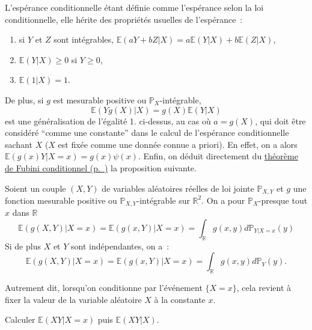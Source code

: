 L'espérance conditionnelle étant définie comme l'espérance selon la loi
conditionnelle, elle hérite des propriétés usuelles de l'espérance~:

\begin{enumerate}
\def\labelenumi{\arabic{enumi}.}
\tightlist
\item
  si \(Y\) et \(Z\) sont intégrables,
  \(\mathbb{E}(aY + bZ | X) = a \mathbb{E}(Y | X) + b \mathbb{E}(Z | X)\),
\item
  \(\mathbb{E}(Y | X) \geq 0\) si \(Y \geq 0\),
\item
  \(\mathbb{E}(1 | X) = 1\).
\end{enumerate}

De plus, si \(g\) est mesurable positive ou \(\mathbb{P}_X\)-intégrable,
\[ \mathbb{E}(Y g(X) | X) = g(X) \mathbb{E}(Y | X) \] est une
généralisation de l'égalité 1. ci-dessus, au cas où \(a = g(X)\), qui
doit être considéré ``comme une constante'' dans le calcul de
l'espérance conditionnelle sachant \(X\) (\(X\) est fixée comme une
donnée connue a priori). En effet, on a alors
\(\mathbb{E}(g(x)Y|X=x) = g(x)\psi(x)\). Enfin, on déduit directement du
\protect\hyperref[III-fubinicond]{théorème de Fubini
conditionnel (p.~\pageref*{III-fubinicond})} la proposition suivante.

\begin{proposition}\label{III-transfcond}

Soient un couple \((X,Y)\) de variables aléatoires réelles de loi jointe
\(\mathbb{P}_{X,Y}\) et \(g\) une fonction mesurable positive ou
\(\mathbb{P}_{X,Y}\)-intégrable sur \(\mathbb{R}^2\). On a pour
\(\mathbb{P}_X\)-presque tout \(x\) dans \(\mathbb{R}\)
\[\mathbb{E}(g(X,Y)|X=x) = \mathbb{E}(g(x,Y)|X=x) = \int_{\mathbb{R}}g(x,y) d\mathbb{P}_{Y|X=x} (y)\]
Si de plus \(X\) et \(Y\) sont indépendantes, on a~:
\[\mathbb{E}(g(X,Y)|X=x) = \mathbb{E}(g(x,Y)|X=x) = \int_{\mathbb{R}}g(x,y) d\mathbb{P}_Y(y).\]

Autrement dit, lorsqu'on conditionne par l'événement \(\{X=x\}\), cela
revient à fixer la valeur de la variable aléatoire \(X\) à la constante
\(x\).
\end{proposition}

\label{III-prod}
Calculer \(\mathbb{E}(XY|X=x)\) puis
\(\mathbb{E}(XY|X)\).

